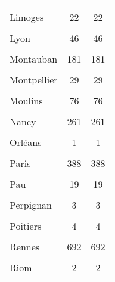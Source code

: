 {\begin{tabular}{l*{2}{c}}
            &                     &                     \\
[1em]
Limoges     &          22         &          22         \\
            &                     &                     \\
[1em]
Lyon        &          46         &          46         \\
            &                     &                     \\
[1em]
Montauban   &         181         &         181         \\
            &                     &                     \\
[1em]
Montpellier &          29         &          29         \\
            &                     &                     \\
[1em]
Moulins     &          76         &          76         \\
            &                     &                     \\
[1em]
Nancy       &         261         &         261         \\
            &                     &                     \\
[1em]
Orléans     &           1         &           1         \\
            &                     &                     \\
[1em]
Paris       &         388         &         388         \\
            &                     &                     \\
[1em]
Pau         &          19         &          19         \\
            &                     &                     \\
[1em]
Perpignan   &           3         &           3         \\
            &                     &                     \\
[1em]
Poitiers    &           4         &           4         \\
            &                     &                     \\
[1em]
Rennes      &         692         &         692         \\
            &                     &                     \\
[1em]
Riom        &           2         &           2         \\

\end{tabular}}
